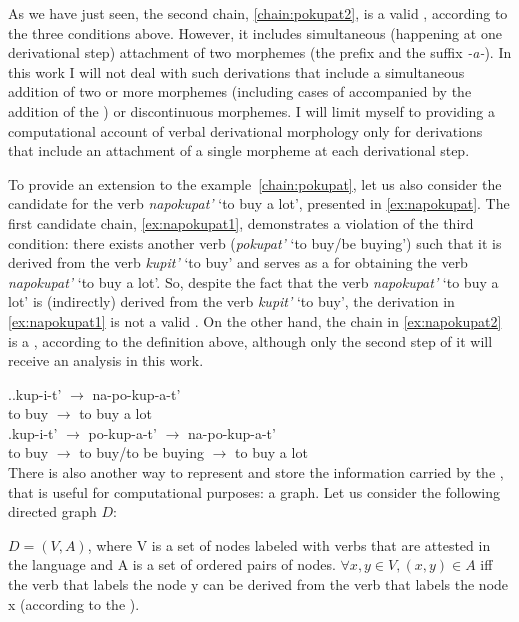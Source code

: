 As we have just seen, the second chain, \ref{chain:pokupat2}, is a valid , according to the three conditions above. However, it includes simultaneous (happening at one derivational step) attachment of two morphemes (the prefix  and the suffix \textit{-a-}). In this work I will not deal with such derivations that include a simultaneous addition of two or more morphemes (including cases of  accompanied by the addition of the ) or discontinuous morphemes. I will limit myself to providing a computational account of verbal derivational morphology only for derivations that include an attachment of a single morpheme at each derivational step.

To provide an extension to the example~\ref{chain:pokupat}, let us also consider the candidate  for the verb \textit{napokupat'} `to buy a lot', presented in \ref{ex:napokupat}. The first candidate chain, \ref{ex:napokupat1}, demonstrates a violation of the third condition: there exists another verb (\textit{pokupat'} `to buy/be buying') such that it is derived from the verb \textit{kupit'} `to buy' and serves as a  for obtaining the verb \textit{napokupat'} `to buy a lot'. So, despite the fact that the verb \textit{napokupat'} `to buy a lot' is (indirectly) derived from the verb \textit{kupit'} `to buy', the derivation in \ref{ex:napokupat1} is not a valid . On the other hand, the chain in \ref{ex:napokupat2} is a , according to the definition above, although only the second step of it will receive an analysis in this work.\largerpage[-1]

\ex.\label{ex:napokupat}\ag.\label{ex:napokupat1}kup-i-t'\textsuperscript{\PF} $\rightarrow$ na-po-kup-a-t'\textsuperscript{\PF}\\	
{to buy} $\rightarrow$ {to buy a lot}\\
\bg.\label{ex:napokupat2}kup-i-t'\textsuperscript{\PF} $\rightarrow$ po-kup-a-t'\textsuperscript{\IPF} $\rightarrow$ na-po-kup-a-t'\textsuperscript{\PF}\\
{to buy} $\rightarrow$ {to buy/to be buying} $\rightarrow$ {to buy a lot}\\

There is also another way to represent and store the information carried by the , that is useful for computational purposes: a graph. Let us consider the following directed graph $D$: 
\begin{definition}\label{def:chain}
$D = (V,A)$, where V is a set of nodes labeled with verbs that are attested in the language and A is a set of ordered pairs of nodes. $\forall x,y \in V, (x,y) \in A$ iff  the verb that labels the node y can be derived from the verb that labels the node x (according to the ).
\end{definition}

